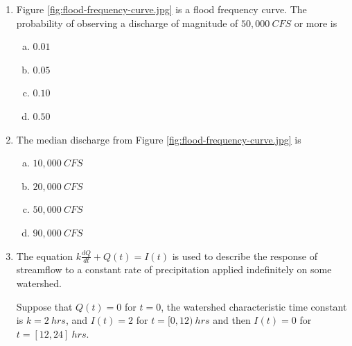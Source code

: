 \documentclass[12pt]{article}
\begin{document}
\begin{enumerate}
\item Figure \ref{fig:flood-frequency-curve.jpg} is a flood frequency curve.   The probability of observing a discharge of magnitude of $50,000~CFS$ or more is
\begin{enumerate}[(a)]
\item $0.01$
\item $0.05$
\item $0.10$
\item $0.50$
\end{enumerate}

\item The median discharge from Figure \ref{fig:flood-frequency-curve.jpg} is
\begin{enumerate}[(a)]
\item $10,000~CFS$
\item $20,000~CFS$
\item $50,000~CFS$
\item $90,000~CFS$
\end{enumerate}

\clearpage

\item The equation $k\frac{dQ}{dt} + Q(t) = I(t)$ is used to describe the response of streamflow to a constant rate of precipitation applied indefinitely on some watershed.  

Suppose that $Q(t)=0$ for $t=0$, the watershed characteristic time constant is $k=2~hrs$, and $I(t) =2$ for $t=[0,12)~hrs$ and then $I(t) =0$ for $t=[12,24]~hrs$. 


\end{enumerate}
\end{document}
